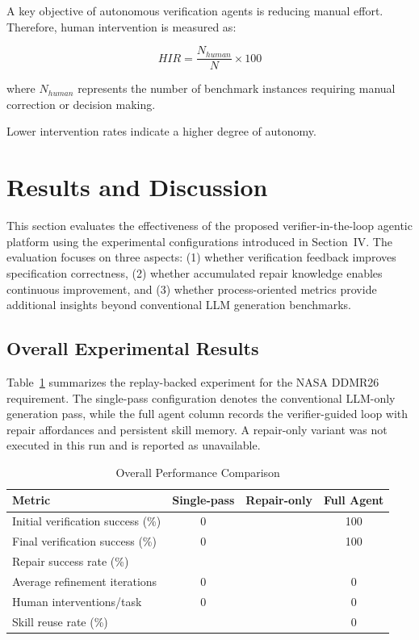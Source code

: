 A key objective of autonomous verification agents is reducing manual effort.
Therefore, human intervention is measured as:

\begin{equation}
HIR =
\frac{N_{human}}
{N}
\times 100
\end{equation}

where $N_{human}$ represents the number of benchmark instances requiring manual
correction or decision making.

Lower intervention rates indicate a higher degree of autonomy.

\section{Results and Discussion}

This section evaluates the effectiveness of the proposed verifier-in-the-loop
agentic platform using the experimental configurations introduced in
Section~IV. The evaluation focuses on three aspects: (1) whether verification
feedback improves specification correctness, (2) whether accumulated repair
knowledge enables continuous improvement, and (3) whether process-oriented
metrics provide additional insights beyond conventional LLM generation
benchmarks.


\subsection{Overall Experimental Results}

Table~\ref{tab:overall_results} summarizes the replay-backed experiment for the
NASA DDMR26 requirement. The single-pass configuration denotes the conventional
LLM-only generation pass, while the full agent column records the verifier-guided
loop with repair affordances and persistent skill memory. A repair-only variant
was not executed in this run and is reported as unavailable.

\begin{table}[t]
\caption{Overall Performance Comparison}
\label{tab:overall_results}
\centering
\begin{tabular}{lccc}
\toprule
Metric &
Single-pass &
Repair-only &
Full Agent\\
\midrule
Initial verification success (\%) &
0 &
\textemdash{} &
100\\

Final verification success (\%) &
0 &
\textemdash{} &
100\\

Repair success rate (\%) &
\textemdash{} &
\textemdash{} &
\textemdash{}\\

Average refinement iterations &
0 &
\textemdash{} &
0\\

Human interventions/task &
0 &
\textemdash{} &
0\\

Skill reuse rate (\%) &
\textemdash{} &
\textemdash{} &
0\\
\bottomrule
\end{tabular}
\end{table}

